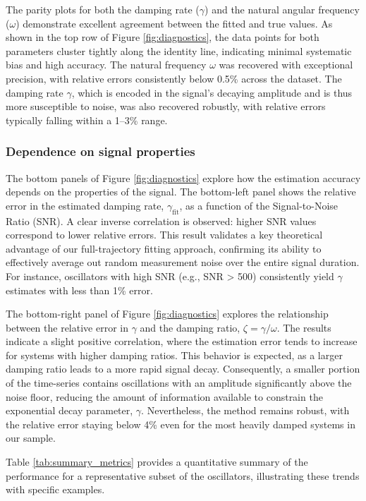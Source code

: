 \documentclass[]{article}
\begin{document}
The parity plots for both the damping rate ($\gamma$) and the natural angular frequency ($\omega$) demonstrate excellent agreement between the fitted and true values. As shown in the top row of Figure \ref{fig:diagnostics}, the data points for both parameters cluster tightly along the identity line, indicating minimal systematic bias and high accuracy. The natural frequency $\omega$ was recovered with exceptional precision, with relative errors consistently below 0.5\% across the dataset. The damping rate $\gamma$, which is encoded in the signal's decaying amplitude and is thus more susceptible to noise, was also recovered robustly, with relative errors typically falling within a 1--3\% range.

\subsubsection{Dependence on signal properties}

The bottom panels of Figure \ref{fig:diagnostics} explore how the estimation accuracy depends on the properties of the signal. The bottom-left panel shows the relative error in the estimated damping rate, $\gamma_{\text{fit}}$, as a function of the Signal-to-Noise Ratio (SNR). A clear inverse correlation is observed: higher SNR values correspond to lower relative errors. This result validates a key theoretical advantage of our full-trajectory fitting approach, confirming its ability to effectively average out random measurement noise over the entire signal duration. For instance, oscillators with high SNR (e.g., SNR > 500) consistently yield $\gamma$ estimates with less than 1\% error.

The bottom-right panel of Figure \ref{fig:diagnostics} explores the relationship between the relative error in $\gamma$ and the damping ratio, $\zeta = \gamma / \omega$. The results indicate a slight positive correlation, where the estimation error tends to increase for systems with higher damping ratios. This behavior is expected, as a larger damping ratio leads to a more rapid signal decay. Consequently, a smaller portion of the time-series contains oscillations with an amplitude significantly above the noise floor, reducing the amount of information available to constrain the exponential decay parameter, $\gamma$. Nevertheless, the method remains robust, with the relative error staying below 4\% even for the most heavily damped systems in our sample.

Table \ref{tab:summary_metrics} provides a quantitative summary of the performance for a representative subset of the oscillators, illustrating these trends with specific examples.
\end{document}
